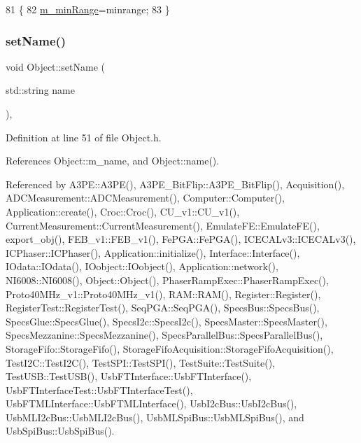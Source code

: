 \begin{DoxyCode}
81                                   \{
82     \hyperlink{classAcquisition_a06b3ea027ebdcb15f64a6517ceb99b76}{m\_minRange}=minrange;
83   \}
\end{DoxyCode}
\mbox{\label{classObject_ae30fea75683c2d149b6b6d17c09ecd0c}} 
\subsubsection{\texorpdfstring{set\+Name()}{setName()}}
{\footnotesize\ttfamily void Object\+::set\+Name (\begin{DoxyParamCaption}\item[{std\+::string}]{name }\end{DoxyParamCaption})\hspace{0.3cm}{\ttfamily [inline]}, {\ttfamily [inherited]}}



Definition at line 51 of file Object.\+h.



References Object\+::m\+\_\+name, and Object\+::name().



Referenced by A3\+P\+E\+::\+A3\+P\+E(), A3\+P\+E\+\_\+\+Bit\+Flip\+::\+A3\+P\+E\+\_\+\+Bit\+Flip(), Acquisition(), A\+D\+C\+Measurement\+::\+A\+D\+C\+Measurement(), Computer\+::\+Computer(), Application\+::create(), Croc\+::\+Croc(), C\+U\+\_\+v1\+::\+C\+U\+\_\+v1(), Current\+Measurement\+::\+Current\+Measurement(), Emulate\+F\+E\+::\+Emulate\+F\+E(), export\+\_\+obj(), F\+E\+B\+\_\+v1\+::\+F\+E\+B\+\_\+v1(), Fe\+P\+G\+A\+::\+Fe\+P\+G\+A(), I\+C\+E\+C\+A\+Lv3\+::\+I\+C\+E\+C\+A\+Lv3(), I\+C\+Phaser\+::\+I\+C\+Phaser(), Application\+::initialize(), Interface\+::\+Interface(), I\+Odata\+::\+I\+Odata(), I\+Oobject\+::\+I\+Oobject(), Application\+::network(), N\+I6008\+::\+N\+I6008(), Object\+::\+Object(), Phaser\+Ramp\+Exec\+::\+Phaser\+Ramp\+Exec(), Proto40\+M\+Hz\+\_\+v1\+::\+Proto40\+M\+Hz\+\_\+v1(), R\+A\+M\+::\+R\+A\+M(), Register\+::\+Register(), Register\+Test\+::\+Register\+Test(), Seq\+P\+G\+A\+::\+Seq\+P\+G\+A(), Specs\+Bus\+::\+Specs\+Bus(), Specs\+Glue\+::\+Specs\+Glue(), Specs\+I2c\+::\+Specs\+I2c(), Specs\+Master\+::\+Specs\+Master(), Specs\+Mezzanine\+::\+Specs\+Mezzanine(), Specs\+Parallel\+Bus\+::\+Specs\+Parallel\+Bus(), Storage\+Fifo\+::\+Storage\+Fifo(), Storage\+Fifo\+Acquisition\+::\+Storage\+Fifo\+Acquisition(), Test\+I2\+C\+::\+Test\+I2\+C(), Test\+S\+P\+I\+::\+Test\+S\+P\+I(), Test\+Suite\+::\+Test\+Suite(), Test\+U\+S\+B\+::\+Test\+U\+S\+B(), Usb\+F\+T\+Interface\+::\+Usb\+F\+T\+Interface(), Usb\+F\+T\+Interface\+Test\+::\+Usb\+F\+T\+Interface\+Test(), Usb\+F\+T\+M\+L\+Interface\+::\+Usb\+F\+T\+M\+L\+Interface(), Usb\+I2c\+Bus\+::\+Usb\+I2c\+Bus(), Usb\+M\+L\+I2c\+Bus\+::\+Usb\+M\+L\+I2c\+Bus(), Usb\+M\+L\+Spi\+Bus\+::\+Usb\+M\+L\+Spi\+Bus(), and Usb\+Spi\+Bus\+::\+Usb\+Spi\+Bus().


